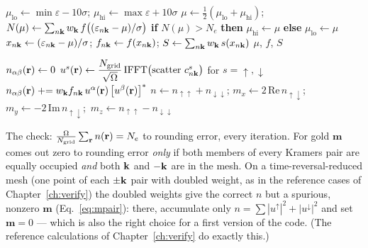 \begin{algorithm}[H]
\caption{Fermi level and occupations}
\label{alg:fermi}
\begin{algorithmic}[1]
\State $\mu_{\mathrm{lo}} \gets \min\varepsilon - 10\sigma$;\quad
$\mu_{\mathrm{hi}} \gets \max\varepsilon + 10\sigma$
 
\State $\mu \gets \tfrac12(\mu_{\mathrm{lo}}+\mu_{\mathrm{hi}})$;\quad
$N(\mu) \gets \sum_{n\mathbf{k}} w_{\mathbf{k}}\, f\big((\varepsilon_{n\mathbf{k}}-\mu)/\sigma\big)$
\State \textbf{if} $N(\mu) > N_e$ \textbf{then} $\mu_{\mathrm{hi}}\gets\mu$
\textbf{else} $\mu_{\mathrm{lo}}\gets\mu$
\EndFor
\State $x_{n\mathbf{k}} \gets (\varepsilon_{n\mathbf{k}}-\mu)/\sigma$;\quad
$f_{n\mathbf{k}} \gets f(x_{n\mathbf{k}})$;\quad
$S \gets \sum_{n\mathbf{k}} w_{\mathbf{k}}\, s(x_{n\mathbf{k}})$
\State \Return $\mu$, $f$, $S$ 
\EndFunction
\end{algorithmic}
\end{algorithm}

\begin{algorithm}[H]
\caption{Density matrix from the spinor bands}
\label{alg:density}
\begin{algorithmic}[1]
\State $n_{\alpha\beta}(\mathbf{r}) \gets 0$
\State $u^{s}(\mathbf{r}) \gets \dfrac{N_{\mathrm{grid}}}{\sqrt\Omega}\,
\mathrm{IFFT}\big(\text{scatter } c^{s}_{n\mathbf{k}}\big)$ for $s =
\uparrow,\downarrow$ 
\State $n_{\alpha\beta}(\mathbf{r}) \mathrel{+}= w_{\mathbf{k}} f_{n\mathbf{k}}\,
u^{\alpha}(\mathbf{r})\,\big[u^{\beta}(\mathbf{r})\big]^{*}$
\EndFor
\State $n \gets n_{\uparrow\uparrow}+n_{\downarrow\downarrow}$;\quad
$m_x \gets 2\,\mathrm{Re}\,n_{\uparrow\downarrow}$;\
$m_y \gets -2\,\mathrm{Im}\,n_{\uparrow\downarrow}$;\
$m_z \gets n_{\uparrow\uparrow}-n_{\downarrow\downarrow}$
\end{algorithmic}
\end{algorithm}

The check: $\frac{\Omega}{N_{\mathrm{grid}}}\sum_{\mathbf{r}} n(\mathbf{r}) = N_e$ to
rounding error, every iteration. For gold $\mathbf m$ comes out zero to
rounding error \emph{only} if both members of every Kramers pair are
equally occupied \emph{and} both $\mathbf{k}$ and $-\mathbf{k}$ are in the mesh. On a
time-reversal-reduced mesh (one point of each $\pm\mathbf{k}$ pair with doubled
weight, as in the reference cases of Chapter~\ref{ch:verify}) the doubled
weights give the correct $n$ but a spurious, nonzero $\mathbf m$
(Eq.~\eqref{eq:mpair}): there, accumulate only
$n = \sum |u^\uparrow|^2 + |u^\downarrow|^2$ and set $\mathbf m = 0$
--- which is also the right choice for a first version of the code. (The
reference calculations of Chapter~\ref{ch:verify} do exactly this.)

